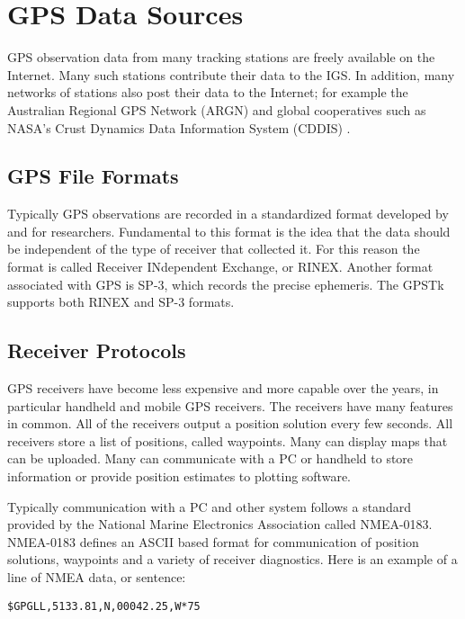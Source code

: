 \section{GPS Data Sources}

GPS observation data from many tracking stations are freely available on the Internet. Many such stations contribute their data to the IGS. In addition, many networks of stations also post their data to the Internet; for example the Australian Regional GPS Network (ARGN) \cite{argn:website} and global cooperatives such as NASA's Crust Dynamics Data Information System (CDDIS) \cite{cddis:website}.

\subsection{GPS File Formats}
Typically GPS observations are recorded in a standardized format developed by and for researchers. Fundamental to this format is the idea that the data should be independent of the type of receiver that collected it. For this reason the format is called Receiver INdependent Exchange, or RINEX. Another format associated with GPS is SP-3, which records the precise ephemeris. The GPSTk supports both RINEX and SP-3 formats.


\subsection{Receiver Protocols}

GPS receivers have become less expensive and more capable over the years, in particular handheld and mobile GPS receivers. The receivers have many features in common. All of the receivers output a position solution every few seconds. All receivers store a list of positions, called waypoints. Many can display maps that can be uploaded. Many can communicate with a PC or handheld to store information or provide position estimates to plotting software.

Typically communication with a PC and other system follows a standard provided by the National Marine Electronics Association called NMEA-0183. NMEA-0183 defines an ASCII based format for communication of position solutions, waypoints and a variety of receiver diagnostics. Here is an example of a line of NMEA data, or sentence:

\begin{verbatim}
$GPGLL,5133.81,N,00042.25,W*75
\end{verbatim}


